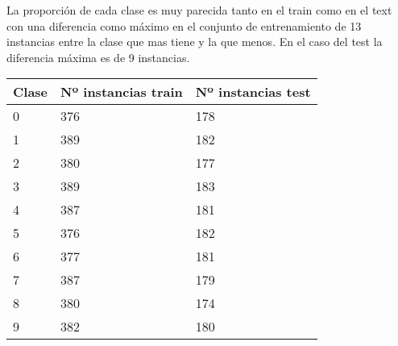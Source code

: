 \documentclass[titlepage]{article}
\begin{document}
	La proporción de cada clase es muy parecida tanto en el train como en el text con una diferencia como máximo en el conjunto de entrenamiento de 13 instancias entre la clase que mas tiene y la que menos. En el caso del test la diferencia máxima es de 9 instancias. 
	
		\begin{table}[htbp]
		\begin{center}
			\begin{tabular}{|l|l|l|}
				\hline
				Clase & Nº instancias train & Nº instancias test\\
				\hline
				0 & 376 & 178\\ 
				\hline
				1 & 389 & 182\\ 
				\hline
				2 & 380 & 177\\ 
				\hline
				3 & 389 & 183\\ 
				\hline
				4 & 387 & 181\\ 
				\hline
				5 & 376 & 182\\ 
				\hline
				6 & 377 & 181\\ 
				\hline
				7 & 387 & 179\\ 
				\hline
				8 & 380 & 174\\ 
				\hline
				9 & 382 & 180\\ 
				\hline
			\end{tabular}
		\end{center}
	\end{table}
  
\end{document}
